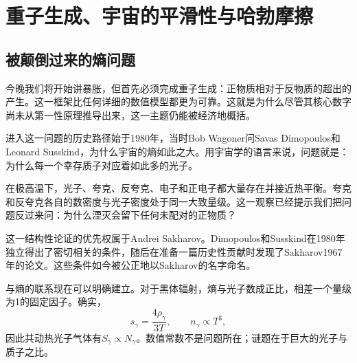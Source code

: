 \chapter{重子生成、宇宙的平滑性与哈勃摩擦}


\section{被颠倒过来的熵问题}

今晚我们将开始讲暴胀，但首先必须完成重子生成：正物质相对于反物质的超出的产生。这一框架比任何详细的数值模型都更为可靠。这就是为什么尽管其核心数字尚未从第一性原理推导出来，这一主题仍能被经济地概括。

进入这一问题的历史路径始于1980年，当时Bob Wagoner问Savas Dimopoulos和Leonard Susskind，为什么宇宙的熵如此之大。用宇宙学的语言来说，问题就是：为什么每一个幸存质子对应着如此多的光子。

在极高温下，光子、夸克、反夸克、电子和正电子都大量存在并接近热平衡。夸克和反夸克各自的数密度与光子密度处于同一大致量级。这一观察已经提示我们把问题反过来问：为什么湮灭会留下任何未配对的正物质？

这一结构性论证的优先权属于Andrei Sakharov。Dimopoulos和Susskind在1980年独立得出了密切相关的条件，随后在准备一篇历史性贡献时发现了Sakharov1967年的论文。这些条件如今被公正地以Sakharov的名字命名。

与熵的联系现在可以明确建立。对于黑体辐射，熵与光子数成正比，相差一个量级为1的固定因子。确实，
\begin{equation}
s_\gamma=\frac{4\rho_\gamma}{3T},
\qquad
n_\gamma\propto T^3,
\end{equation}
因此共动热光子气体有\(S_\gamma\propto N_\gamma\)。数值常数不是问题所在；谜题在于巨大的光子与质子之比。

\begin{classroomqa}
\end{classroomqa}

